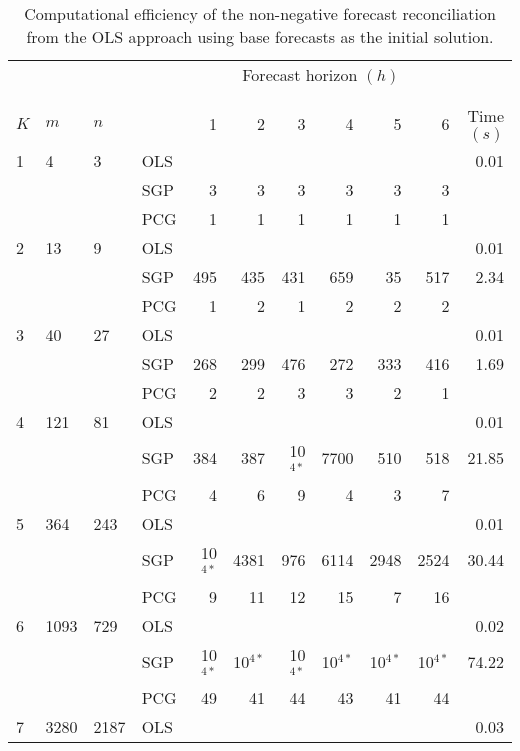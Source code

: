 \documentclass[11pt]{article}
\newcommand{\0}{\phantom{0}}
\begin{document}
\begin{table}[ht]
	\small
	\tabcolsep=0.20cm
	\caption{Computational efficiency of the non-negative forecast reconciliation from the OLS approach using base forecasts as the initial solution.}
	\label{tbl:perfnnolsb}
	\centering
	\begin{threeparttable}
		\begin{tabular}{llllrrrrrrr}
			\toprule
			& & & & \multicolumn{6}{c}{Forecast horizon $(h)$}\\[-0.3cm]\\\cline{5-10}\\[-0.3cm]
			$K$ & $m$ & $n$ & & 1 & 2 & 3 & 4 & 5 & 6 & Time $(s)$\\
			\midrule
			1 & 4 & 3 & OLS & & & & & & & 0.01\\
			& & & SGP & 3 & 3 & 3 & 3 & 3 & 3 & \pmb{$0.03$} \\
			& & & PCG & 1 & 1 & 1 & 1 & 1 & 1 & \pmb{$0.03$} \\
			\midrule
			2 & 13 & 9 & OLS & & & & & & & 0.01 \\
			& & & SGP & 495 & 435 & 431 & 659 & 35 & 517 & 2.34 \\
			& & & PCG & 1 & 2 & 1 & 2 & 2 & 2 & \pmb{$0.11$} \\
			\midrule
			3 & 40 & 27 & OLS & & & & & & & 0.01 \\
			& & & SGP & 268 & 299 & 476 & 272 & 333 & 416 & 1.69 \\
			& & & PCG & 2 & 2 & 3 & 3 & 2 & 1 & \pmb{$0.15$} \\
			\midrule		
			4 & 121 & 81 & OLS & & & & & & & 0.01 \\
			& & & SGP & 384 & 387 & 10$^{4*}$ & 7700 & 510 & 518 & 21.85 \\
			& & & PCG & 4 & 6 & 9 & 4 & 3 & 7 & \pmb{$0.30$} \\
			\midrule
			5 & 364 & 243 & OLS & & & & & & & 0.01 \\
			& & & SGP & 10$^{4*}$ & 4381 & 976 & 6114 & 2948 & 2524 & 30.44 \\
			& & & PCG & 9 & 11 & 12 & 15 & 7 & 16 & \pmb{$0.53$} \\
			\midrule		
			6 & 1093 & 729 & OLS & & & & & & & 0.02 \\
			& & & SGP & 10$^{4*}$ & 10$^{4*}$ & 10$^{4*}$ & 10$^{4*}$ & 10$^{4*}$ & 10$^{4*}$ & 74.22 \\
			& & & PCG & 49 & 41 & 44 & 43 & 41 & 44 & \pmb{$1.32$} \\
			\midrule
			7 & 3280 & 2187 & OLS & & & & & & & 0.03 \\

\end{tabular}
\end{threeparttable}
\end{table}
\end{document}
